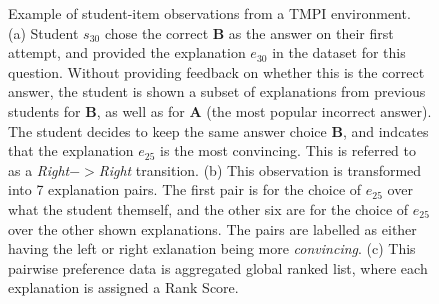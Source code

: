 \documentclass[notitlepage,12pt]{jedm}
\begin{document}
\begin{figure}
	\centering
	\def\svgscale{0.40}
	
	\caption{
	Example of student-item observations from a TMPI environment. 
	(a) Student $s_{30}$ chose the correct \textbf{B} as the answer on 
	their first attempt, and provided the explanation $e_{30}$ in the 
	dataset 
	for this question. 
	Without providing feedback on whether this is the correct answer, the 
	student is shown a subset of explanations from previous students for 
	\textbf{B}, as well as for \textbf{A} (the most popular incorrect 
	answer). 
	The student decides to keep the same answer choice \textbf{B}, and 
	indcates that the explanation $e_{25}$ is the most convincing.
	This is referred to as a \textit{Right}$->$\textit{Right} transition.
	(b) This observation is transformed into 7 explanation pairs. The first 
	pair is for the choice of $e_{25}$ over what the student themself, 
	and the other six are for the choice of $e_{25}$ over the other shown 
	explanations. 
	The pairs are labelled as either having the left or right exlanation 
	being 
	more \textit{convincing}.
	(c) This pairwise preference data is aggregated global ranked list, 
	where 
	each explanation is assigned a Rank Score. 
}
\label{fig:make_pairs_a}
\end{figure}
\end{document}
